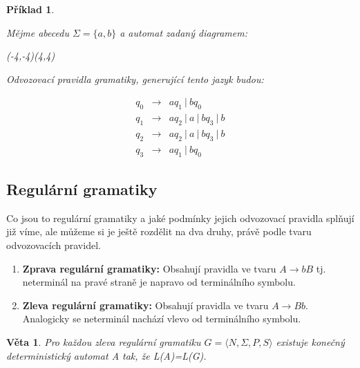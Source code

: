 \documentclass[10pt, a4paper, titlepage]{article}
\theoremstyle{note}
\newtheorem{veta}{Věta}
\newtheorem{priklad}{Příklad}
\begin{document}
\begin{priklad}\label{priklad-4}

Mějme abecedu $\Sigma = \lbrace a,b \rbrace$ a automat zadaný diagramem:
\begin{center}
\begin{VCPicture}{(-4,-4)(4,4)}
\end{VCPicture}
\end{center}

Odvozovací pravidla gramatiky, generující tento jazyk budou:

\begin{eqnarray*}
q_0 &\rightarrow& aq_1\ |\ bq_0 \\
q_1 &\rightarrow& aq_2\ |\ a\ |\ bq_3\ |\  b \\
q_2 &\rightarrow& aq_2\ |\ a\ |\ bq_3\ |\  b \\
q_3 &\rightarrow& aq_1\ |\ bq_0
\end{eqnarray*}

\end{priklad}

\subsection{Regulární gramatiky}

Co jsou to regulární gramatiky a jaké podmínky jejich odvozovací pravidla splňují již víme, ale můžeme si je ještě rozdělit na dva druhy, právě podle tvaru odvozovacích pravidel.

\begin{enumerate}

\item
\textbf{Zprava regulární gramatiky:}
Obsahují pravidla ve tvaru $ A \rightarrow bB $ tj. neterminál na pravé straně je napravo od terminálního symbolu.
\item
\textbf{Zleva regulární gramatiky:}
Obsahují pravidla ve tvaru $ A \rightarrow Bb $. Analogicky se neterminál nachází vlevo od terminálního symbolu.
\end{enumerate}

\begin{veta}
Pro každou zleva regulární gramatiku $ G = \langle N,\Sigma,P,S \rangle $ existuje konečný deterministický automat \textit{A} tak, že \textit{L(A)=L(G)}.
\end{veta}
\end{document}

